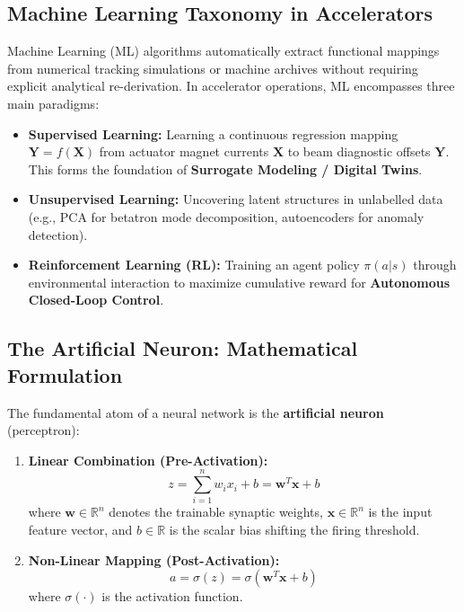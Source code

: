 \documentclass[11pt,a4paper]{article}
\begin{document}
\subsection{Machine Learning Taxonomy in Accelerators}
Machine Learning (ML) algorithms automatically extract functional mappings from numerical tracking simulations or machine archives without requiring explicit analytical re-derivation. In accelerator operations, ML encompasses three main paradigms:
\begin{itemize}
    \item \textbf{Supervised Learning:} Learning a continuous regression mapping $\mathbf{Y} = f(\mathbf{X})$ from actuator magnet currents $\mathbf{X}$ to beam diagnostic offsets $\mathbf{Y}$. This forms the foundation of \textbf{Surrogate Modeling / Digital Twins}.
    \item \textbf{Unsupervised Learning:} Uncovering latent structures in unlabelled data (e.g., PCA for betatron mode decomposition, autoencoders for anomaly detection).
    \item \textbf{Reinforcement Learning (RL):} Training an agent policy $\pi(a|s)$ through environmental interaction to maximize cumulative reward for \textbf{Autonomous Closed-Loop Control}.
\end{itemize}

\subsection{The Artificial Neuron: Mathematical Formulation}
The fundamental atom of a neural network is the \textbf{artificial neuron} (perceptron):
\begin{enumerate}
    \item \textbf{Linear Combination (Pre-Activation):}
    \begin{equation}
        z = \sum_{i=1}^n w_i x_i + b = \mathbf{w}^T \mathbf{x} + b
    \end{equation}
    where $\mathbf{w} \in \mathbb{R}^n$ denotes the trainable synaptic weights, $\mathbf{x} \in \mathbb{R}^n$ is the input feature vector, and $b \in \mathbb{R}$ is the scalar bias shifting the firing threshold.
    
    \item \textbf{Non-Linear Mapping (Post-Activation):}
    \begin{equation}
        a = \sigma(z) = \sigma(\mathbf{w}^T \mathbf{x} + b)
    \end{equation}
    where $\sigma(\cdot)$ is the activation function.
\end{enumerate}
\end{document}

